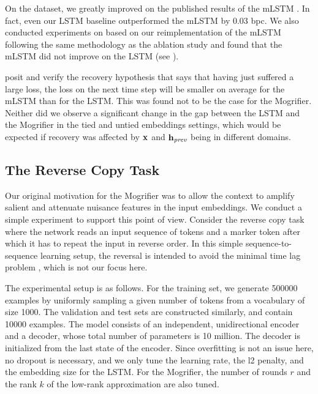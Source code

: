 On the \enwik dataset, we greatly improved on the published results of
the mLSTM \citep{DBLP:journals/corr/KrauseLMR16}.
%
In fact, even our LSTM baseline outperformed the mLSTM by 0.03 bpc.
%
We also conducted experiments on \ptb based on our reimplementation of
the mLSTM following the same methodology as the ablation study and
found that the mLSTM did not improve on the LSTM (see
).

\cite{DBLP:journals/corr/KrauseLMR16} posit and verify the recovery
hypothesis that says that having just suffered a large loss, the loss
on the next time step will be smaller on average for the mLSTM than
for the LSTM.
%
This was found not to be the case for the Mogrifier.
%
Neither did we observe a significant change in the gap between the
LSTM and the Mogrifier in the tied and untied embeddings settings,
which would be expected if recovery was affected by $\mathbf{x}$ and
$\mathbf{h}_{\textit{prev}}$ being in different domains.

\subsection{The Reverse Copy Task}

Our original motivation for the Mogrifier was to allow the context to
amplify salient and attenuate nuisance features in the input
embeddings.
%
We conduct a simple experiment to support this point of view.
%
Consider the reverse copy task where the network reads an input
sequence of tokens and a marker token after which it has to repeat the
input in reverse order.
%
In this simple sequence-to-sequence learning
\citep{sutskever2014sequence} setup, the reversal is intended to avoid
the minimal time lag problem \citep{hochreiter1997lstm}, which is not
our focus here.

The experimental setup is as follows.
%
For the training set, we generate \num{500000} examples by uniformly
sampling a given number of tokens from a vocabulary of size
\num{1000}.
%
The validation and test sets are constructed similarly, and contain
\num{10000} examples.
%
The model consists of an independent, unidirectional encoder and a
decoder, whose total number of parameters is \num{10} million.
%
The decoder is initialized from the last state of the encoder.
%
Since overfitting is not an issue here, no dropout is necessary, and
we only tune the learning rate, the l2 penalty, and the embedding size for
the LSTM.
%
For the Mogrifier, the number of rounds $r$ and the rank $k$ of the
low-rank approximation are also tuned.

